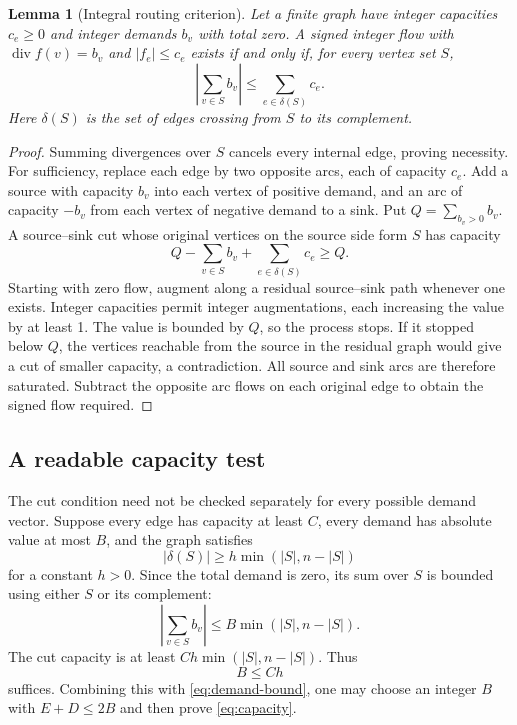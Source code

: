 \documentclass[11pt]{article}
\newtheorem{lemma}[theorem]{Lemma}
\theoremstyle{definition}
\begin{document}
\begin{lemma}[Integral routing criterion]\label{lem:flow}
Let a finite graph have integer capacities \(c_e\ge0\) and integer demands
\(b_v\) with total zero. A signed integer flow with
\(\operatorname{div}f(v)=b_v\) and \(|f_e|\le c_e\) exists if and only if,
for every vertex set \(S\),
\begin{equation}\label{eq:cut}
 \left|\sum_{v\in S}b_v\right|\le\sum_{e\in\delta(S)}c_e.
\end{equation}
Here \(\delta(S)\) is the set of edges crossing from \(S\) to its complement.
\end{lemma}
\begin{proof}
Summing divergences over \(S\) cancels every internal edge, proving necessity.
For sufficiency, replace each edge by two opposite arcs, each of capacity
\(c_e\). Add a source with capacity \(b_v\) into each vertex of positive demand,
and an arc of capacity \(-b_v\) from each vertex of negative demand to a sink.
Put \(Q=\sum_{b_v>0}b_v\). A source--sink cut whose original vertices on the
source side form \(S\) has capacity
\[
 Q-\sum_{v\in S}b_v+\sum_{e\in\delta(S)}c_e\ge Q.
\]
Starting with zero flow, augment along a residual source--sink path whenever
one exists. Integer capacities permit integer augmentations, each increasing
the value by at least 1. The value is bounded by \(Q\), so the process stops.
If it stopped below \(Q\), the vertices reachable from the source in the
residual graph would give a cut of smaller capacity, a contradiction. All
source and sink arcs are therefore saturated. Subtract the opposite arc flows
on each original edge to obtain the signed flow required.
\end{proof}

\subsection{A readable capacity test}

The cut condition need not be checked separately for every possible demand
vector. Suppose every edge has capacity at least \(C\), every demand has
absolute value at most \(B\), and the graph satisfies
\[
 |\delta(S)|\ge h\min(|S|,n-|S|)
\]
for a constant \(h>0\). Since the total demand is zero, its sum over \(S\)
is bounded using either \(S\) or its complement:
\[
 \left|\sum_{v\in S}b_v\right|
 \le B\min(|S|,n-|S|).
\]
The cut capacity is at least \(Ch\min(|S|,n-|S|)\). Thus
\begin{equation}\label{eq:capacity}
 B\le Ch
\end{equation}
suffices. Combining this with \eqref{eq:demand-bound}, one may choose an
integer \(B\) with \(E+D\le2B\) and then prove \eqref{eq:capacity}.
\end{document}

